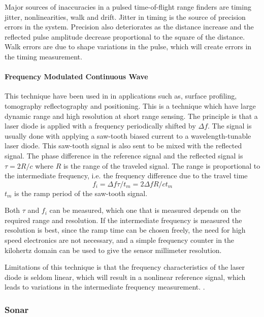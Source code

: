 Major sources of inaccuracies in a pulsed time-of-flight range finders are timing jitter,
nonlinearities, walk and drift. Jitter in timing is the source of precision errors in the
system. Precision also deteriorates as the distance increase and the reflected pulse
amplitude decrease proportional to the square of the distance\cite{pulsed-tof}.
Walk errors are due to shape variations in the pulse, which will create errors in the
timing measurement. 





\paragraph{Frequency Modulated Continuous Wave}
This technique have been used in in applications such as, surface profiling, tomography
reflectography and positioning. This is a technique which have large dynamic range and
high resolution at short range sensing. The principle is that a laser diode is applied
with a frequency periodically shifted by $\Delta f$. The signal is usually done with
applying a saw-tooth biased current to a wavelength-tunable laser diode. This saw-tooth
signal is also sent to be mixed with the reflected signal. The phase difference in the
reference signal and the reflected signal is $\tau = 2 R / c$ where $R$ is the range of
the traveled signal. The range is proportional to the intermediate frequency, i.e. the
frequency difference due to the travel time
\begin{equation}
    f_i = \Delta f \tau /t_m = 2 \Delta f R /c t_m
\end{equation}
$t_m$ is the ramp period of the saw-tooth signal. 

Both $\tau$ and $f_i$ can be measured, which one that is measured depends on the required
range and resolution. If the intermediate frequency is measured the resolution is best,
since the ramp time can be chosen freely, the need for high speed electronics are not
necessary, and a simple frequency counter in the kilohertz domain can be used to give the
sensor millimeter resolution.

Limitations of this technique is that the frequency characteristics of the laser diode is
seldom linear, which will result in a nonlinear reference signal, which leads to
variations in the intermediate frequency measurement.
\cite{laser-ranging-critical-review}.

\subsubsection{Sonar}



